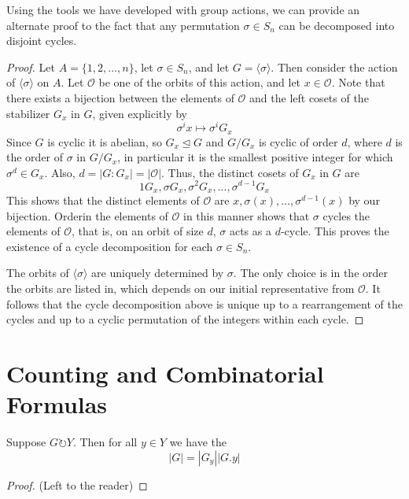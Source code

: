 \documentclass[12pt, a4paper, oneside, openright, titlepage]{book}
\begin{document}
Using the tools we have developed with group actions, we can provide an alternate proof to the fact that any permutation $\sigma \in S_n$ can be decomposed into disjoint cycles.

\begin{proof}
    Let $A = \{1,2,...,n\}$, let $\sigma \in S_n$, and let $G =\langle \sigma \rangle$. Then consider the action of $\langle \sigma \rangle$ on $A$. Let $\mathcal{O}$ be one of the orbits of this action, and let $x \in \mathcal{O}$. Note that there exists a bijection between the elements of $\mathcal{O}$ and the left cosets of the stabilizer $G_x$ in $G$, given explicitly by \begin{equation*}
        \sigma^ix\mapsto \sigma^iG_x
    \end{equation*}
    Since $G$ is cyclic it is abelian, so $G_x \trianglelefteq G$ and $G/G_x$ is cyclic of order $d$, where $d$ is the order of $\sigma$ in $G/G_x$, in particular it is the smallest positive integer for which $\sigma^d \in G_x$. Also, $d = |G:G_x| = |\mathcal{O}|$. Thus, the distinct cosets of $G_x$ in $G$ are \begin{equation*}
        1G_x,\sigma G_x,\sigma^2G_x,...,\sigma^{d-1}G_x
    \end{equation*}
    This shows that the distinct elements of $\mathcal{O}$ are $x,\sigma(x),...,\sigma^{d-1}(x)$ by our bijection. Orderin the elements of $\mathcal{O}$ in this manner shows that $\sigma$ cycles the elements of $\mathcal{O}$, that is, on an orbit of size $d$, $\sigma$ acts as a $d$-cycle. This proves the existence of a cycle decomposition for each $\sigma \in S_n$.


    The orbits of $\langle \sigma \rangle$ are uniquely determined by $\sigma$. The only choice is in the order the orbits are listed in, which depends on our initial representative from $\mathcal{O}$. It follows that the cycle decomposition above is unique up to a rearrangement of the cycles and up to a cyclic permutation of the integers within each cycle.
\end{proof}


\section{\textsection Counting and Combinatorial Formulas}


\begin{namthm}
        Suppose $G \circlearrowright Y$. Then for all $y \in Y$ we have the  \begin{equation}
                |G| = |G_y||G.y|
        \end{equation}
\end{namthm}
\begin{proof}
        (Left to the reader)
\end{proof}
\end{document}
